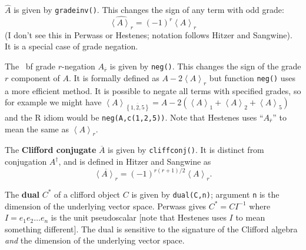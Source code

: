 \documentclass{birkjour}
\theoremstyle{definition}
\theoremstyle{remark}
\numberwithin{equation}{section}
\begin{document}
{    ${\widehat{A}}$ is given by {\tt gradeinv()}.  This
    changes the sign of any term with odd grade:
    $$
    {\widehat{\left\langle A\right\rangle_r} =(-1)^r\left\langle
      A\right\rangle_r}
    $$
    (I don't see this in Perwass or Hestenes; notation follows Hitzer
    and Sangwine).  It is a special case of grade negation.
    \item The {\ bf grade ${r}$-negation} ${A_{\overline{r}}}$ is
      given by {\tt neg()}.  This changes the sign of the grade ${r}$
      component of ${A}$.  It is formally defined as ${A-2\left\langle
        A\right\rangle_r}$ but function {\tt neg()} uses a more
      efficient method.  It is possible to negate all terms with
      specified grades, so for example we might have ${\left\langle
        A\right\rangle_{\overline{\left\lbrace 1,2,5\right\rbrace}} =
        A-2\left( \left\langle A\right\rangle_1 +\left\langle
        A\right\rangle_2+\left\langle A\right\rangle_5\right)}$ and
      the R idiom would be {\tt neg(A,c(1,2,5))}.  Note that Hestenes
      uses ``${A_{\overline{r}}}$'' to mean the same as
      ${\left\langle A\right\rangle_r}$.
    \item The {\bf Clifford conjugate} ${\overline{A}}$ is given by
      {\tt cliffconj()}.  It is distinct from conjugation
      ${A^\dagger}$, and is defined in Hitzer and Sangwine as
    $$
    {\overline{\left\langle A\right\rangle_r} =
      (-1)^{r(r+1)/2}\left\langle A\right\rangle_r.}
    $$
    \item The {\bf dual} ${C^*}$ of a clifford object ${C}$ is given
      by {\tt dual(C,n)}; argument {\tt n} is the dimension of the
      underlying vector space.  Perwass gives ${C^*=CI^{-1}}$ where
      ${I=e_1e_2\ldots e_n}$ is the unit pseudoscalar [note that
        Hestenes uses ${I}$ to mean something different].  The dual is
      sensitive to the signature of the Clifford algebra \emph{and}
      the dimension of the underlying vector space.
      }
\end{document}
